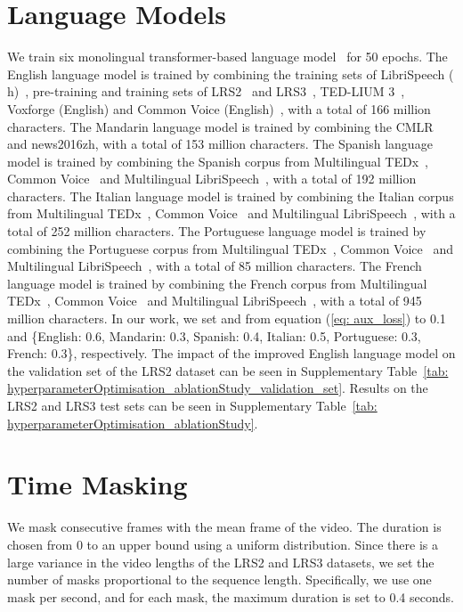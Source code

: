 \documentclass[twocolumn]{article}
\begin{document}
\section{Language Models}
\label{sec:SI_LM}
We train six monolingual transformer-based language model~\cite{irie2019language} for 50 epochs. The English language model is trained by combining the training sets of LibriSpeech (\,h)~\cite{panayotov2015librispeech}, pre-training and training sets of LRS2~\cite{chung2017lip} and LRS3~\cite{afouras2018lrs3}, TED-LIUM 3~\cite{DBLP:conf/specom/HernandezNGTE18}, Voxforge (English) and Common Voice (English)~\cite{DBLP:conf/lrec/ArdilaBDKMHMSTW20}, with a total of 166 million characters. The Mandarin language model is trained by combining the CMLR~\cite{zhao2019cascade} and news2016zh, with a total of 153 million characters. The Spanish language model is trained by combining the Spanish corpus from Multilingual TEDx~\cite{salesky21_interspeech}, Common Voice~\cite{DBLP:conf/lrec/ArdilaBDKMHMSTW20} and Multilingual LibriSpeech~\cite{Pratap2020MLSAL}, with a total of 192 million characters. The Italian language model is trained by combining the Italian corpus from Multilingual TEDx~\cite{salesky21_interspeech}, Common Voice~\cite{DBLP:conf/lrec/ArdilaBDKMHMSTW20} and Multilingual LibriSpeech~\cite{Pratap2020MLSAL}, with a total of 252 million characters. The Portuguese language model is trained by combining the Portuguese corpus from Multilingual TEDx~\cite{salesky21_interspeech}, Common Voice~\cite{DBLP:conf/lrec/ArdilaBDKMHMSTW20} and Multilingual LibriSpeech~\cite{Pratap2020MLSAL}, with a total of 85 million characters. The French language model is trained by combining the French corpus from Multilingual TEDx~\cite{salesky21_interspeech}, Common Voice~\cite{DBLP:conf/lrec/ArdilaBDKMHMSTW20} and Multilingual LibriSpeech~\cite{Pratap2020MLSAL}, with a total of 945 million characters. In our work, we set  and  from equation (\ref{eq: aux_loss}) to 0.1 and \{English: 0.6, Mandarin: 0.3, Spanish: 0.4, Italian: 0.5, Portuguese: 0.3, French: 0.3\}, respectively. The impact of the improved English language model on the validation set of the LRS2 dataset can be seen in Supplementary Table~\ref{tab: hyperparameterOptimisation_ablationStudy_validation_set}. Results on the LRS2 and LRS3 test sets can be seen in Supplementary Table~\ref{tab: hyperparameterOptimisation_ablationStudy}.

\section{Time Masking}
\label{sec:SI_TM}
We mask  consecutive frames with the mean frame of the video. The duration  is chosen from 0 to an upper bound  using a uniform distribution. Since there is a large variance in the video lengths of the LRS2 and LRS3 datasets, we set the number of masks proportional to the sequence length. Specifically, we use one mask per second, and for each mask, the maximum duration  is set to 0.4 seconds.
\end{document}

